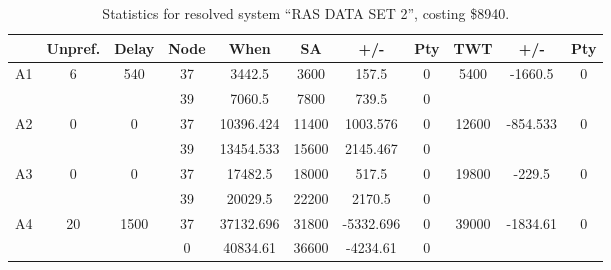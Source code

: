 \begin{sidewaystable}
\footnotesize
\caption{Statistics for resolved system ``RAS DATA SET 2'', costing \$8940.}
\centering
\begin{tabular}{c||c|c||c|c|c|c|c||c|c|c}
  \hline \hline
  &
  Unpref. & 
  Delay &
  Node &
  When &
  SA &
  +/- &
  Pty &
  TWT &
  +/- &
  Pty \\
      \hline
      \multirow{2}{*}{A1} &
      \multirow{2}{*}{6} &
      \multirow{2}{*}{540} &
      37 &
      3442.5 &
      3600 &
        157.5 &
        0 &
      \multirow{2}{*}{5400} &
        \multirow{2}{*}{-1660.5} &
        \multirow{2}{*}{0}
      \\
      \cline{4-8}
       &
       &
       &
      39 &
      7060.5 &
      7800 &
        739.5 &
        0 &
      
         &
        
      \\
      \hline
      \multirow{2}{*}{A2} &
      \multirow{2}{*}{0} &
      \multirow{2}{*}{0} &
      37 &
      10396.424 &
      11400 &
        1003.576 &
        0 &
      \multirow{2}{*}{12600} &
        \multirow{2}{*}{-854.533} &
        \multirow{2}{*}{0}
      \\
      \cline{4-8}
       &
       &
       &
      39 &
      13454.533 &
      15600 &
        2145.467 &
        0 &
      
         &
        
      \\
      \hline
      \multirow{2}{*}{A3} &
      \multirow{2}{*}{0} &
      \multirow{2}{*}{0} &
      37 &
      17482.5 &
      18000 &
        517.5 &
        0 &
      \multirow{2}{*}{19800} &
        \multirow{2}{*}{-229.5} &
        \multirow{2}{*}{0}
      \\
      \cline{4-8}
       &
       &
       &
      39 &
      20029.5 &
      22200 &
        2170.5 &
        0 &
      
         &
        
      \\
      \hline
      \multirow{2}{*}{A4} &
      \multirow{2}{*}{20} &
      \multirow{2}{*}{1500} &
      37 &
      37132.696 &
      31800 &
        -5332.696 &
        0 &
      \multirow{2}{*}{39000} &
        \multirow{2}{*}{-1834.61} &
        \multirow{2}{*}{0}
      \\
      \cline{4-8}
       &
       &
       &
      0 &
      40834.61 &
      36600 &
        -4234.61 &
        0 &
      

\end{tabular}
\end{sidewaystable}

